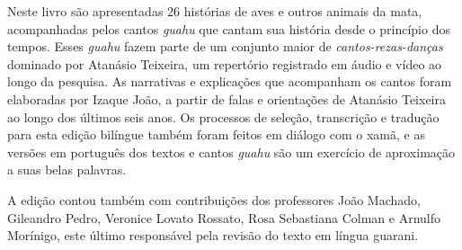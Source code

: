 Neste livro são apresentadas 26 histórias de aves e outros animais da
mata, acompanhadas pelos cantos \textit{guahu} que cantam sua história
desde o princípio dos tempos. Esses \textit{guahu} fazem parte de um
conjunto maior de \textit{cantos-rezas-danças} dominado por Atanásio Teixeira, um
repertório registrado em áudio e vídeo ao longo da pesquisa. As
narrativas e explicações que acompanham os cantos foram elaboradas por
Izaque João, a partir de falas e orientações de Atanásio Teixeira ao
longo dos últimos seis anos. Os processos de seleção, transcrição e
tradução para esta edição bilíngue também foram feitos em diálogo com o
xamã, e as versões em português dos textos e cantos \textit{guahu} são um
exercício de aproximação a suas belas palavras.

A edição contou também com contribuições dos professores João Machado,
Gileandro Pedro, Veronice Lovato Rossato, Rosa Sebastiana Colman e
Arnulfo Morínigo, este último responsável pela revisão do texto em
língua guarani.
